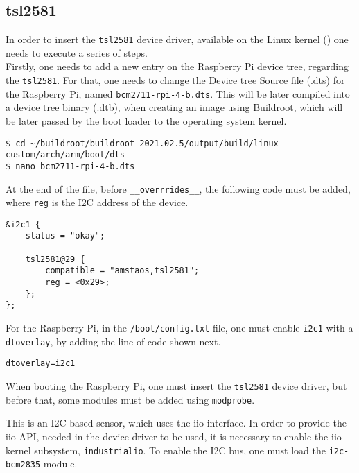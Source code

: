 \subsection{tsl2581}
%
%
In order to insert the \verb|tsl2581| device driver, available on the Linux kernel (\cite{code_tsl}) one needs to execute a series of steps.\\

Firstly, one needs to add a new entry on the Raspberry Pi device tree, regarding the \verb|tsl2581|. For that, one needs to change the Device tree Source file (.dts) for the Raspberry Pi, named \verb|bcm2711-rpi-4-b.dts|. This will be later compiled into a device tree binary (.dtb), when creating an image using Buildroot, which will be later passed by the boot loader to the operating system kernel. \cite{dtb}

\begin{lstlisting}
$ cd ~/buildroot/buildroot-2021.02.5/output/build/linux-custom/arch/arm/boot/dts
$ nano bcm2711-rpi-4-b.dts
\end{lstlisting}

At the end of the file, before \verb|__overrrides__|, the following code must be added, where \verb|reg| is the I2C address of the device. \cite{tsl2583_txt} 

\begin{lstlisting}
&i2c1 {
	status = "okay";
	
	tsl2581@29 {
		compatible = "amstaos,tsl2581";
		reg = <0x29>;
	};
};
\end{lstlisting}

For the Raspberry Pi, in the \verb|/boot/config.txt| file, one must enable \verb|i2c1| with a \verb|dtoverlay|, by adding the line of code shown next.
\begin{lstlisting}
dtoverlay=i2c1
\end{lstlisting}

When booting the Raspberry Pi, one must insert the \verb|tsl2581| device driver, but before that, some modules must be added using \verb|modprobe|.

This is an I2C based sensor, which uses the \ac{iio} interface. In order to provide the \ac{iio} API, needed in the device driver to be used, it is necessary to enable the \ac{iio} kernel subsystem, \verb|industrialio|. To enable the I2C bus, one must load the \verb|i2c-bcm2835| module. \cite{i2c_bcm2835}\\

